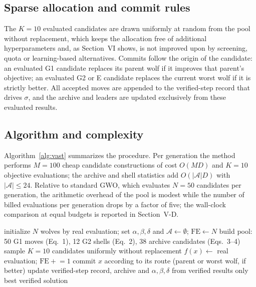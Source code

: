 \documentclass[journal]{IEEEtran}
\newcommand{\method}{VAST-GWO}
\begin{document}
\subsection{Sparse allocation and commit rules}
The $K=10$ evaluated candidates are drawn uniformly at random from the pool
without replacement, which keeps the allocation free of additional
hyperparameters and, as Section~VI shows, is not improved upon by screening,
quota or learning-based alternatives. Commits follow the origin of the
candidate: an evaluated G1 candidate replaces its parent wolf if it improves
that parent's objective; an evaluated G2 or E candidate replaces the current
worst wolf if it is strictly better. All accepted moves are appended to the
verified-step record that drives $\sigma$, and the archive and leaders are
updated exclusively from these evaluated results.

\subsection{Algorithm and complexity}
Algorithm~\ref{alg:vast} summarizes the procedure. Per generation the method
performs $M=100$ cheap candidate constructions of cost $O(MD)$ and $K=10$
objective evaluations; the archive and shell statistics add $O(|\mathcal
A|D)$ with $|\mathcal A|\le 24$. Relative to standard GWO, which evaluates
$N=50$ candidates per generation, the arithmetic overhead of the pool is
modest while the number of billed evaluations per generation drops by a
factor of five; the wall-clock comparison at equal budgets is reported in
Section~V-D.

\begin{algorithm}[t]
\caption{\method{} (one run)}
\label{alg:vast}
\begin{algorithmic}[1]
\State initialize $N$ wolves by real evaluation; set
$\alpha,\beta,\delta$ and $\mathcal A\!\leftarrow\!\emptyset$;
$\mathrm{FE}\!\leftarrow\!N$
  \State build pool: 50 G1 moves (Eq.~1), 12 G2 shells (Eq.~2), 38 archive
  candidates (Eqs.~3--4)
  \State sample $K=10$ candidates uniformly without replacement
     \State $f(x)\leftarrow$ real evaluation; $\mathrm{FE}\!\mathrel{+}\!=\!1$
     \State commit $x$ according to its route (parent or worst wolf, if better)
     \State update verified-step record, archive and
     $\alpha,\beta,\delta$ from verified results only
  \EndFor
\EndWhile
\State \Return best verified solution
\end{algorithmic}
\end{algorithm}
\end{document}

